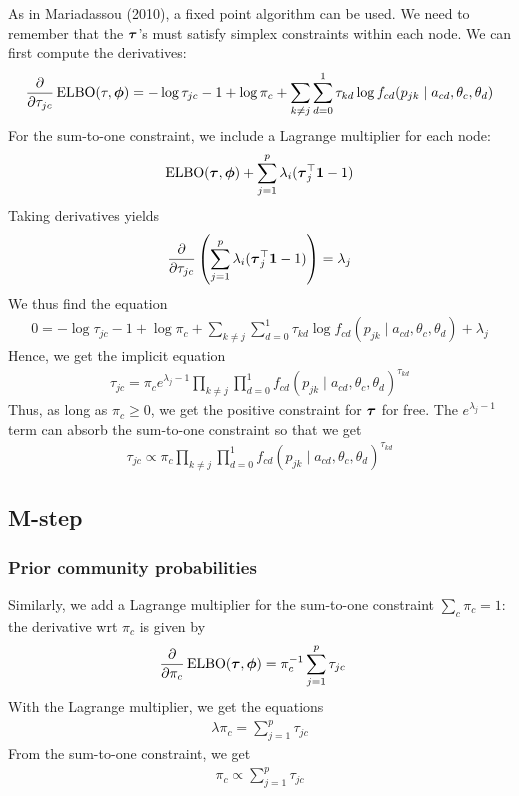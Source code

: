 \documentclass[english]{article}
\begin{document}
As in Mariadassou (2010), a fixed point algorithm can be used. We need to remember that the ${\boldsymbol \tau}$'s must
satisfy simplex constraints within each node. We can first compute the derivatives:
\begin{align*}
    \frac{\partial}{\partial\tau_{jc}}
    \operatorname{ELBO}(\tau,{\boldsymbol \phi})
    =
    -\log\tau_{jc} - 1 +\log\pi_c + 
    \sum_{k\neq j} \sum_{d=0}^{1} \tau_{kd}\log  f_{cd}(p_{jk}\mid a_{cd}, \theta_c,\theta_d)
\end{align*}
For the sum-to-one constraint, we include a Lagrange multiplier for each node:
\begin{align*}
    \operatorname{ELBO}({\boldsymbol \tau},{\boldsymbol \phi}) + \sum_{j=1}^{p} \lambda_i ({\boldsymbol \tau}_j^\top{\mathbf 1} - 1 )
\end{align*}
Taking derivatives yields
\begin{align*}
     \frac{\partial}{\partial\tau_{jc}}
    \left(\sum_{j=1}^{p} \lambda_i ({\boldsymbol \tau}_j^\top{\mathbf 1} - 1 )\right)
    = \lambda_j
\end{align*}
We thus find the equation
\begin{align*}
    0 = 
    -\log\tau_{jc} - 1 +\log\pi_c + 
    \sum_{k\neq j} \sum_{d=0}^{1} \tau_{kd} \log f_{cd}(p_{jk}\mid a_{cd}, \theta_c,\theta_d)
    + \lambda_j
\end{align*}
Hence, we get the implicit equation
\begin{align*}
    \tau_{jc} = \pi_c e^{\lambda_j-1} \prod_{k\neq j}\prod_{d=0}^{1} 
    f_{cd}(p_{jk}\mid a_{cd}, \theta_c,\theta_d)^{\tau_{kd}}
\end{align*}
Thus, as long as $\pi_c\geqslant 0$, we get the positive constraint for ${\boldsymbol \tau}$ for free. 
The $e^{\lambda_j-1}$ term can absorb the sum-to-one constraint so that we get
\begin{align*}
    \tau_{jc} \propto \pi_c \prod_{k\neq j}\prod_{d=0}^{1} 
    f_{cd}(p_{jk}\mid a_{cd}, \theta_c,\theta_d)^{\tau_{kd}}
\end{align*} 

\subsection{M-step}

\subsubsection{Prior community probabilities}

Similarly, we add a Lagrange multiplier for the sum-to-one constraint $\sum_c\pi_c=1$:
the derivative wrt $\pi_c$ is given by
\begin{align*}
    \frac{\partial}{\partial\pi_c} \operatorname{ELBO}({\boldsymbol \tau},{\boldsymbol \phi})
    &= 
    \pi_c^{-1}\sum_{j=1}^{p}\tau_{jc}
\end{align*}
With the Lagrange multiplier, we get the equations
\begin{align*}
    \lambda\pi_c = \sum_{j=1}^{p} \tau_{jc}
\end{align*}
From the sum-to-one constraint, we get
\begin{align*}
    \pi_c \propto \sum_{j=1}^{p} \tau_{jc}
\end{align*}
\end{document}
